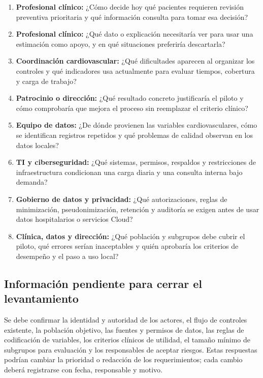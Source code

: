 \documentclass[12pt,a4paper]{article}
\begin{document}
\begin{enumerate}
  \item \textbf{Profesional clínico:} ¿Cómo decide hoy qué pacientes requieren revisión preventiva prioritaria y qué información consulta para tomar esa decisión?
  \item \textbf{Profesional clínico:} ¿Qué dato o explicación necesitaría ver para usar una estimación como apoyo, y en qué situaciones preferiría descartarla?
  \item \textbf{Coordinación cardiovascular:} ¿Qué dificultades aparecen al organizar los controles y qué indicadores usa actualmente para evaluar tiempos, cobertura y carga de trabajo?
  \item \textbf{Patrocinio o dirección:} ¿Qué resultado concreto justificaría el piloto y cómo comprobaría que mejora el proceso sin reemplazar el criterio clínico?
  \item \textbf{Equipo de datos:} ¿De dónde provienen las variables cardiovasculares, cómo se identifican registros repetidos y qué problemas de calidad observan en los datos locales?
  \item \textbf{TI y ciberseguridad:} ¿Qué sistemas, permisos, respaldos y restricciones de infraestructura condicionan una carga diaria y una consulta interna bajo demanda?
  \item \textbf{Gobierno de datos y privacidad:} ¿Qué autorizaciones, reglas de minimización, pseudonimización, retención y auditoría se exigen antes de usar datos hospitalarios o servicios Cloud?
  \item \textbf{Clínica, datos y dirección:} ¿Qué población y subgrupos debe cubrir el piloto, qué errores serían inaceptables y quién aprobaría los criterios de desempeño y el paso a uso local?
\end{enumerate}

\subsection{Información pendiente para cerrar el levantamiento}

Se debe confirmar la identidad y autoridad de los actores, el flujo de controles existente, la población objetivo, las fuentes y permisos de datos, las reglas de codificación de variables, los criterios clínicos de utilidad, el tamaño mínimo de subgrupos para evaluación y los responsables de aceptar riesgos. Estas respuestas podrían cambiar la prioridad o redacción de los requerimientos; cada cambio deberá registrarse con fecha, responsable y motivo.
\end{document}
